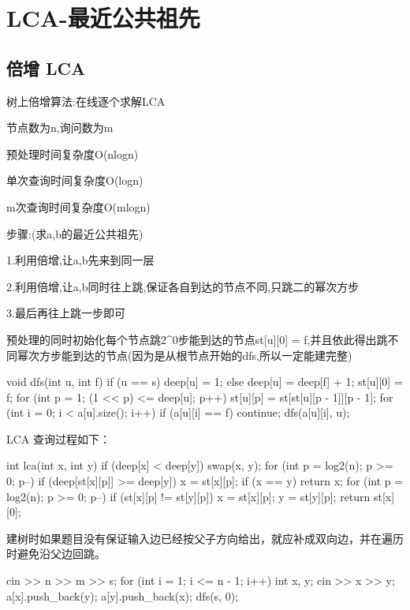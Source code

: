 \documentclass[UTF8,a4paper,11pt]{ctexart}
\newcommand{\topic}[1]{%
  \par\needspace{3\baselineskip}\vspace{0.45em}%
  \noindent{\bfseries\color{Primary}#1}\par\vspace{0.12em}%
}
\begin{document}
\section{LCA-最近公共祖先}

\subsection{倍增 LCA}

树上倍增算法:在线逐个求解LCA

节点数为n,询问数为m

预处理时间复杂度O(nlogn)

单次查询时间复杂度O(logn)

m次查询时间复杂度O(mlogn)

步骤:(求a,b的最近公共祖先)

1.利用倍增,让a,b先来到同一层

2.利用倍增,让a,b同时往上跳,保证各自到达的节点不同,只跳二的幂次方步

3.最后再往上跳一步即可

\topic{预处理与查询}

预处理的同时初始化每个节点跳2\textasciicircum{}0步能到达的节点st[u][0] = f,并且依此得出跳不同幂次方步能到达的节点(因为是从根节点开始的dfs,所以一定能建完整)

\begin{CodeBlock}
void dfs(int u, int f) {
    if (u == s)
        deep[u] = 1;
    else
        deep[u] = deep[f] + 1;
    st[u][0] = f;
    for (int p = 1; (1 << p) <= deep[u]; p++)
        st[u][p] = st[st[u][p - 1]][p - 1];
    for (int i = 0; i < a[u].size(); i++) {
        if (a[u][i] == f)
            continue;
        dfs(a[u][i], u);
    }
}
\end{CodeBlock}

LCA 查询过程如下：

\begin{CodeBlock}
int lca(int x, int y) {
    if (deep[x] < deep[y])
        swap(x, y);
    for (int p = log2(n); p >= 0; p--) {
        if (deep[st[x][p]] >= deep[y])
            x = st[x][p];
    }
    if (x == y)
        return x;
    for (int p = log2(n); p >= 0; p--) {
        if (st[x][p] != st[y][p]) {
            x = st[x][p];
            y = st[y][p];
        }
    }
    return st[x][0];
}
\end{CodeBlock}

建树时如果题目没有保证输入边已经按父子方向给出，就应补成双向边，并在遍历时避免沿父边回跳。

\begin{CodeBlock}
cin >> n >> m >> s;
for (int i = 1; i <= n - 1; i++) {
    int x, y;
    cin >> x >> y;
    a[x].push_back(y);
    a[y].push_back(x);
}
dfs(s, 0);
\end{CodeBlock}
\end{document}
